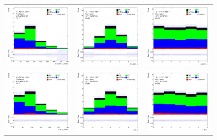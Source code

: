 \begin{figure}[htbp]
\centering
  \begin{tabular}{ccc}


    \includegraphics[width=.25\textwidth]{figures/PreFitPlots/lep4_tWZ_4T_SF_L_lepton_pt.png} &
    \includegraphics[width=.25\textwidth]{figures/PreFitPlots/lep4_tWZ_4T_SF_L_lepton_eta.png} &
    \includegraphics[width=.25\textwidth]{figures/PreFitPlots/lep4_tWZ_4T_SF_L_lepton_phi.png} \\
    \includegraphics[width=.25\textwidth]{figures/PreFitPlots/lep4_tWZ_4T_SF_LJet_pt.png} &
    \includegraphics[width=.25\textwidth]{figures/PreFitPlots/lep4_tWZ_4T_SF_LJet_eta.png} &
    \includegraphics[width=.25\textwidth]{figures/PreFitPlots/lep4_tWZ_4T_SF_LJet_phi.png} \\


\end{tabular}
\end{figure}
